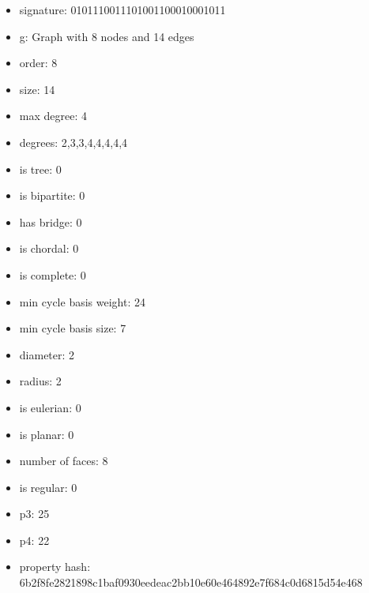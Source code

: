 \begin{itemize}
\item signature: 0101110011101001100010001011
\item g: Graph with 8 nodes and 14 edges
\item order: 8
\item size: 14
\item max degree: 4
\item degrees: 2,3,3,4,4,4,4,4
\item is tree: 0
\item is bipartite: 0
\item has bridge: 0
\item is chordal: 0
\item is complete: 0
\item min cycle basis weight: 24
\item min cycle basis size: 7
\item diameter: 2
\item radius: 2
\item is eulerian: 0
\item is planar: 0
\item number of faces: 8
\item is regular: 0
\item p3: 25
\item p4: 22
\item property hash: 6b2f8fe2821898c1baf0930eedeac2bb10e60e464892e7f684c0d6815d54e468
\end{itemize}
\newpage
\begin{figure}
\end{figure}
